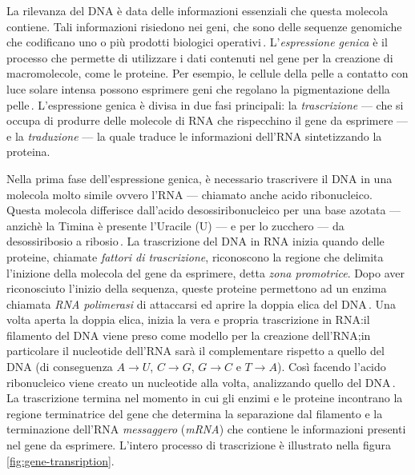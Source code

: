 La rilevanza del DNA è data delle informazioni essenziali che questa molecola contiene. Tali informazioni risiedono nei geni, che sono delle sequenze genomiche che codificano uno o più prodotti biologici operativi\,\cite{gerstein2007gene}. L'\textsl{espressione genica} è il processo che permette di utilizzare i dati contenuti nel gene per la creazione di macromolecole, come le proteine. Per esempio, le cellule della pelle a contatto con luce solare intensa possono esprimere geni che regolano la pigmentazione della pelle\,\cite{white2009gene}. L'espressione genica è divisa in due fasi principali: la \textsl{trascrizione} — che si occupa di produrre delle molecole di RNA che rispecchino il gene da esprimere — e la \textsl{traduzione} — la quale traduce le informazioni dell'RNA sintetizzando la proteina.

Nella prima fase dell'espressione genica, è necessario trascrivere il DNA in una molecola molto simile ovvero l'RNA — chiamato anche acido ribonucleico. Questa molecola differisce dall'acido desossiribonucleico per una base azotata — anzichè la Timina è presente l'Uracile (U) — e per lo zucchero — da desossiribosio a ribosio\,\cite{alberts2002dna}. La trascrizione del DNA in RNA inizia quando delle proteine, chiamate \textsl{fattori di trascrizione}, riconoscono la regione che delimita l'inizione della molecola del gene da esprimere, detta \textsl{zona promotrice}. Dopo aver riconosciuto l'inizio della sequenza, queste proteine permettono ad un enzima chiamata \textsl{RNA polimerasi} di attaccarsi ed aprire la doppia elica del DNA\,\cite{cramer2019organization}. Una volta aperta la doppia elica, inizia la vera e propria trascrizione in RNA:\@ il filamento del DNA viene preso come modello per la creazione dell'RNA;\@ in particolare il nucleotide dell'RNA sarà il complementare rispetto a quello del DNA (di conseguenza $A\to U$, $C\to G$, $G\to C$ e $T\to A$). Così facendo l'acido ribonucleico viene creato un nucleotide alla volta, analizzando quello del DNA\,\cite{alberts2002dna}. La trascrizione termina nel momento in cui gli enzimi e le proteine incontrano la regione terminatrice del gene che determina la separazione dal filamento e la terminazione dell'RNA \textsl{messaggero} (\textsl{mRNA}) che contiene le informazioni presenti nel gene da esprimere. L'intero processo di trascrizione è illustrato nella figura\,\ref{fig:gene-transription}.

